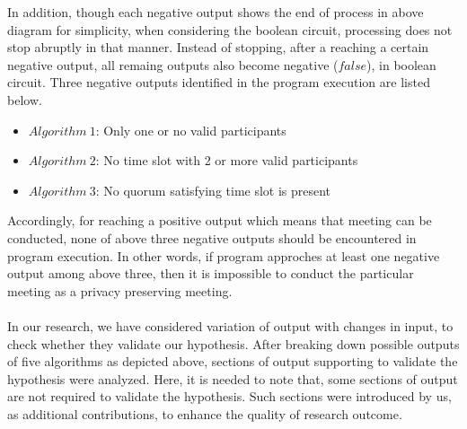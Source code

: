In addition, though each negative output shows the end of process in above diagram for simplicity, when considering the boolean circuit, processing does not stop abruptly in that manner. Instead of stopping, after a reaching a certain negative output, all remaing outputs also become negative ($false$), in boolean circuit. Three negative outputs identified in the program execution are listed below.
\begin{itemize}
    \item $Algorithm\ 1$: Only one or no valid participants
    \item $Algorithm\ 2$: No time slot with 2 or more valid participants
    \item $Algorithm\ 3$: No quorum satisfying time slot is present
\end{itemize}
Accordingly, for reaching a positive output which means that meeting can be conducted, none of above three negative outputs should be encountered in program execution. In other words, if program approches at least one negative output among above three, then it is impossible to conduct the particular meeting as a privacy preserving meeting.\\ \\
In our research, we have considered variation of output with changes in input, to check whether they validate our hypothesis. After breaking down possible outputs of five algorithms as depicted above, sections of output supporting to validate the hypothesis were analyzed. Here, it is needed to note that, some sections of output are not required to validate the hypothesis. Such sections were introduced by us, as additional contributions, to enhance the quality of research outcome.\\ \\

